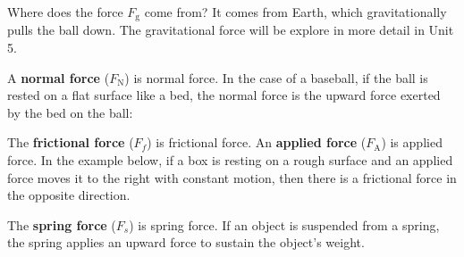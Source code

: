 \documentclass[dvipsnames]{article}
\begin{document}
Where does the force $F_\mathrm{g}$ come from? It comes from Earth, which gravitationally pulls the ball down. The gravitational force will be explore in more detail in Unit 5.

A \textbf{\gls{normal force}} ($F_\text{N}$) is \glsdesc{normal force}. In the case of a baseball, if the ball is rested on a flat surface like a bed, the normal force is the upward force exerted by the bed on the ball:

\begin{center}
\end{center}


The \textbf{\gls{frictional force}} ($F_f$) is \glsdesc{frictional force}. An \textbf{\gls{applied force}} ($F_\mathrm{A}$) is \glsdesc{applied force}. In the example below, if a box is resting on a rough surface and an applied force moves it to the right with constant motion, then there is a frictional force in the opposite direction.

\begin{center}
\end{center}

The \textbf{\gls{spring force}} ($F_s$) is \glsdesc{spring force}. If an object is suspended from a spring, the spring applies an upward force to sustain the object's weight.

\begin{center}
\end{center}
\end{document}
